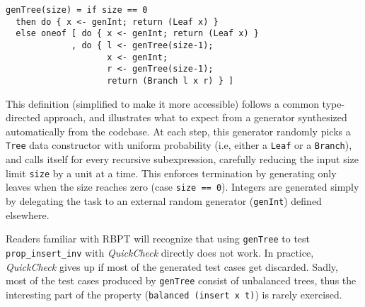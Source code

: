 \documentclass[sigconf,review,anonymous]{acmart}
\newcommand{\quickcheck}{\textit{QuickCheck}\xspace}
\begin{document}



\begin{verbatim}
genTree(size) = if size == 0 
  then do { x <- genInt; return (Leaf x) }
  else oneof [ do { x <- genInt; return (Leaf x) }
             , do { l <- genTree(size-1);
                    x <- genInt;
                    r <- genTree(size-1);
                    return (Branch l x r) } ]
\end{verbatim}

\noindent This definition (simplified to make it more accessible) follows a
common type-directed approach, and illustrates what to expect from a generator
synthesized automatically from the codebase.
%
At each step, this generator randomly picks a \texttt{Tree} data constructor
with uniform probability (i.e, either a \texttt{Leaf} or a \texttt{Branch}), and
calls itself for every recursive subexpression, carefully reducing the input
size limit \texttt{size} by a unit at a time.
%
This enforces termination by generating only leaves when the size reaches zero
(case \texttt{size == 0}).
%
Integers are generated simply by delegating the task to an external random
generator (\texttt{genInt}) defined elsewhere.
%


Readers familiar with RBPT will recognize that using \texttt{genTree} to test
\texttt{prop\_insert\_inv} with \quickcheck directly does not work.
%
In practice, \quickcheck gives up if most of the generated test cases get
discarded.
%
%
Sadly, most of the test cases produced by \texttt{genTree} consist of unbalanced
trees, thus the interesting part of the property (\texttt{balanced (insert x
t)}) is rarely exercised.
\end{document}
